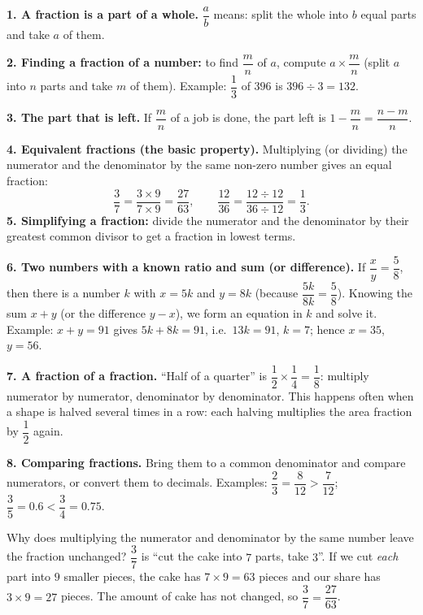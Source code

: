 \begin{knowbox}
\textbf{1. A fraction is a part of a whole.} $\dfrac{a}{b}$ means: split the whole into $b$ equal parts and take $a$ of them.

\textbf{2. Finding a fraction of a number:} to find $\dfrac{m}{n}$ of $a$, compute $a \times \dfrac{m}{n}$
(split $a$ into $n$ parts and take $m$ of them). Example: $\dfrac{1}{3}$ of $396$ is $396 \div 3 = 132$.

\textbf{3. The part that is left.} If $\dfrac{m}{n}$ of a job is done, the part left is $1 - \dfrac{m}{n} = \dfrac{n-m}{n}$.

\textbf{4. Equivalent fractions (the basic property).} Multiplying (or dividing) the numerator and the denominator by the
same non-zero number gives an equal fraction:
\[ \frac{3}{7} = \frac{3\times 9}{7\times 9} = \frac{27}{63}, \qquad \frac{12}{36} = \frac{12\div 12}{36\div 12} = \frac{1}{3}. \]
\textbf{5. Simplifying a fraction:} divide the numerator and the denominator by their greatest common divisor to get a
fraction in lowest terms.

\textbf{6. Two numbers with a known ratio and sum (or difference).} If $\dfrac{x}{y} = \dfrac{5}{8}$, then there is a
number $k$ with $x = 5k$ and $y = 8k$ (because $\dfrac{5k}{8k} = \dfrac58$). Knowing the sum $x + y$ (or the difference
$y - x$), we form an equation in $k$ and solve it. Example: $x + y = 91$ gives $5k + 8k = 91$, i.e.\ $13k = 91$, $k = 7$;
hence $x = 35$, $y = 56$.

\textbf{7. A fraction of a fraction.} ``Half of a quarter'' is $\dfrac12\times\dfrac14 = \dfrac18$: multiply numerator by
numerator, denominator by denominator. This happens often when a shape is halved several times in a row: each halving
multiplies the area fraction by $\dfrac12$ again.

\textbf{8. Comparing fractions.} Bring them to a common denominator and compare numerators, or convert them to
decimals. Examples: $\dfrac23 = \dfrac{8}{12} > \dfrac{7}{12}$; \ $\dfrac35 = 0.6 < \dfrac34 = 0.75$.
\end{knowbox}
\begin{proofbox}
Why does multiplying the numerator and denominator by the same number leave the fraction unchanged? $\dfrac{3}{7}$ is
``cut the cake into $7$ parts, take $3$''. If we cut \emph{each} part into $9$ smaller pieces, the cake has
$7\times 9 = 63$ pieces and our share has $3\times 9 = 27$ pieces. The amount of cake has not changed, so
$\dfrac{3}{7} = \dfrac{27}{63}$.
\end{proofbox}
